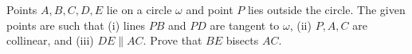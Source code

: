 Points $A,B,C,D,E$ lie on a circle $\omega$ and point $P$ lies outside the circle. The given points are such that (i) lines $PB$ and $PD$ are tangent to $\omega$, (ii) $P, A, C$ are collinear, and (iii) $DE \parallel AC$. Prove that $BE$ bisects $AC$.